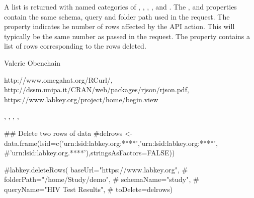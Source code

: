 \documentclass{article}
\begin{document}
\begin{Value}
A list is returned with named categories of , , , ,  and .
The ,  and  properties contain the same schema, query 
and folder path used in the request.  The
 property indicates he number of rows affected by the API action. This will typically be the same
number as passed in the request. The  property contains a list of rows corresponding to the rows
deleted.
\end{Value}
\begin{Author}\relax
Valerie Obenchain
\end{Author}
\begin{References}\relax
http://www.omegahat.org/RCurl/, \\
http://dssm.unipa.it/CRAN/web/packages/rjson/rjson.pdf,\\
https://www.labkey.org/project/home/begin.view
\end{References}
\begin{SeeAlso}\relax
{}, , , 
, 
\end{SeeAlso}
\begin{Examples}
\begin{ExampleCode}

## Delete two rows of data
#delrows <- data.frame(lsid=c('urn:lsid:labkey.org:****','urn:lsid:labkey.org:****',
#'urn:lsid:labkey.org.****'),stringsAsFactors=FALSE))

#labkey.deleteRows(     baseUrl="https://www.labkey.org", 
#                                       folderPath="/home/Study/demo", 
#                                       schemaName="study",     
#                                       queryName="HIV Test Results",   
#                                       toDelete=delrows)

\end{ExampleCode}
\end{Examples}
\end{document}
